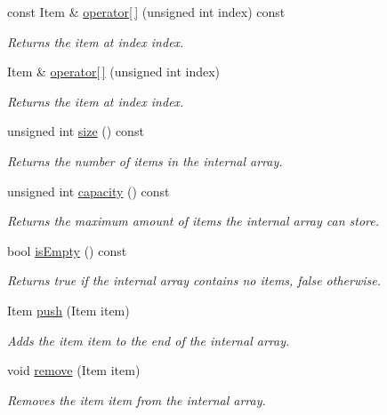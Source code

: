 \begin{DoxyCompactItemize}
const Item \& \hyperlink{classtsgl_1_1_array_acd182e906a6942eecdd30e455bed1fb1}{operator\mbox{[}$\,$\mbox{]}} (unsigned int index) const
\begin{DoxyCompactList}\small\item\em Returns the item at index {\ttfamily index}. \end{DoxyCompactList}\item 
Item \& \hyperlink{classtsgl_1_1_array_ae98fe9dc7998ec3b694150a8f70d8423}{operator\mbox{[}$\,$\mbox{]}} (unsigned int index)
\begin{DoxyCompactList}\small\item\em Returns the item at index {\ttfamily index}. \end{DoxyCompactList}\item 
\mbox{\label{classtsgl_1_1_array_a945191eccbeb8ddc0d41d0dcbd0dad27}} 
unsigned int \hyperlink{classtsgl_1_1_array_a945191eccbeb8ddc0d41d0dcbd0dad27}{size} () const
\begin{DoxyCompactList}\small\item\em Returns the number of items in the internal array. \end{DoxyCompactList}\item 
\mbox{\label{classtsgl_1_1_array_a93fe927b935ab1672df60e7587c5f885}} 
unsigned int \hyperlink{classtsgl_1_1_array_a93fe927b935ab1672df60e7587c5f885}{capacity} () const
\begin{DoxyCompactList}\small\item\em Returns the maximum amount of items the internal array can store. \end{DoxyCompactList}\item 
\mbox{\label{classtsgl_1_1_array_a3ae7b36afe82a55f0b3b5e24bb8f006c}} 
bool \hyperlink{classtsgl_1_1_array_a3ae7b36afe82a55f0b3b5e24bb8f006c}{is\+Empty} () const
\begin{DoxyCompactList}\small\item\em Returns true if the internal array contains no items, false otherwise. \end{DoxyCompactList}\item 
Item \hyperlink{classtsgl_1_1_array_aca25dfa4218b2c872d1e1cd2a1a32caa}{push} (Item item)
\begin{DoxyCompactList}\small\item\em Adds the item {\ttfamily item} to the end of the internal array. \end{DoxyCompactList}\item 
void \hyperlink{classtsgl_1_1_array_aa6b198643094a1b567f8f8bda76dcc53}{remove} (Item item)
\begin{DoxyCompactList}\small\item\em Removes the item {\ttfamily item} from the internal array. \end{DoxyCompactList}\end{DoxyCompactItemize}


